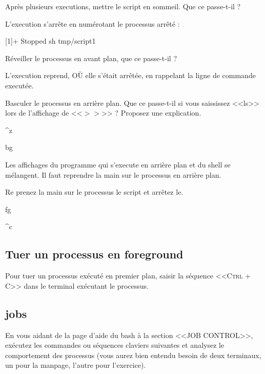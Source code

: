 \documentclass[11pt]{article}
\begin{document}
Après plusieurs executions, mettre le script en sommeil. Que ce passe-t-il ?

\begin{solution}
L'execution s'arrête en numérotant le processus arrêté :

[1]+  Stopped                 sh tmp/script1
\end{solution}

Réveiller le processus en avant plan, que ce passe-t-il ?

\begin{solution}
L'execution reprend, OÙ elle s'était arrêtée, en rappelant la ligne de commande executée.
\end{solution}

Basculer le processus en arrière plan. Que ce passe-t-il si vous saississez <<ls>> lors de l'affichage de <<$>> $>> ? Proposez une explication.

\begin{solution}

\^{}z

bg

Les affichages du programme qui s'execute en arrière plan et du shell se mélangent. Il faut reprendre la main sur le processus en arrière plan.

\end{solution}

Re prenez la main sur le processus le script et arrêtez le.

\begin{solution}

fg

\^{}c
\end{solution}

\subsection{Tuer un processus en foreground}

Pour tuer un processus exécuté en premier plan, saisir la séquence \textsc{<<Ctrl + C>>} dans le terminal exécutant le processus.

\subsection{jobs}

En vous aidant de la page d’aide du bash à la section <<JOB CONTROL>>, exécutez les commandes ou séquences claviers suivantes et analysez le comportement des processus (vous aurez bien
entendu besoin de deux terminaux, un pour la manpage, l’autre pour l’exercice). 
\end{document}
